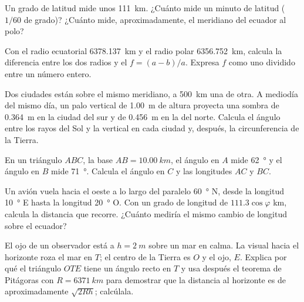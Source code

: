 \begin{exercise}[$\star$]\label{exo:g10:measuring-the-earth:4}
Un grado de latitud mide unos \qty{111}{km}. ¿Cuánto mide un minuto de
latitud ($1/60$ de grado)? ¿Cuánto mide, aproximadamente, el meridiano del
ecuador al polo?
\end{exercise}

\begin{exercise}[$\star$]\label{exo:g10:measuring-the-earth:5}
Con el radio ecuatorial \qty{6378.137}{km} y el radio polar
\qty{6356.752}{km}, calcula la diferencia entre los dos radios y el
 $f = (a-b)/a$. Expresa $f$ como uno dividido entre un número
entero.
\end{exercise}

\begin{exercise}[$\star\star$]\label{exo:g10:measuring-the-earth:6}
Dos ciudades están sobre el mismo meridiano, a \qty{500}{km} una de otra. A
mediodía del mismo día, un palo vertical de \qty{1.00}{m} de altura proyecta
una sombra de \qty{0.364}{m} en la ciudad del sur y de \qty{0.456}{m} en la
del norte. Calcula el ángulo entre los rayos del Sol y la vertical en cada
ciudad y, después, la circunferencia de la Tierra.
\end{exercise}

\begin{exercise}[$\star\star$]\label{exo:g10:measuring-the-earth:7}
En un triángulo $ABC$, la base $AB = \qty{10.00}{km}$, el ángulo en $A$ mide
\qty{62}{\degree} y el ángulo en $B$ mide \qty{71}{\degree}. Calcula el
ángulo en $C$ y las longitudes $AC$ y $BC$.
\end{exercise}

\begin{exercise}[$\star\star$]\label{exo:g10:measuring-the-earth:8}
Un avión vuela hacia el oeste a lo largo del paralelo \qty{60}{\degree} N,
desde la longitud \qty{10}{\degree} E hasta la longitud \qty{20}{\degree} O.
Con un grado de longitud de $111.3 \cos \varphi$ km, calcula la distancia
que recorre. ¿Cuánto mediría el mismo cambio de longitud sobre el ecuador?
\end{exercise}

\begin{exercise}[$\star\star$]\label{exo:g10:measuring-the-earth:9}
El ojo de un observador está a $h = \qty{2}{m}$ sobre un mar en calma. La
visual hacia el horizonte roza el mar en $T$; el centro de la Tierra es $O$
y el ojo, $E$. Explica por qué el triángulo $OTE$ tiene un ángulo recto en
$T$ y usa después el teorema de Pitágoras con $R = \qty{6371}{km}$ para
demostrar que la distancia al horizonte es de aproximadamente $\sqrt{2Rh}$;
calcúlala.
\end{exercise}

